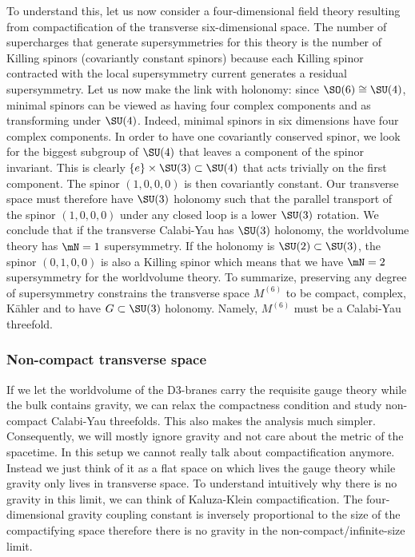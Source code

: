 \documentclass{worksheetclass}
\begin{document}
        To understand this, let us now consider a four-dimensional field theory resulting from compactification of the transverse six-dimensional space. The number of supercharges that generate supersymmetries for this theory is the number of Killing spinors (covariantly constant spinors) because each Killing spinor contracted with the local supersymmetry current generates a residual supersymmetry. Let us now make the link with holonomy: since $\SO(6)\cong\SU(4)$, minimal spinors can be viewed as having four complex components and as transforming under $\SU(4)$. Indeed, minimal spinors in six dimensions have four complex components. In order to have one covariantly conserved spinor, we look for the biggest subgroup of $\SU(4)$ that leaves a component of the spinor invariant. This is clearly $\{e\}\times\SU(3)\subset\SU(4)$ that acts trivially on the first component. The spinor $(1,0,0,0)$ is then covariantly constant. Our transverse space must therefore have $\SU(3)$ holonomy such that the parallel transport of the spinor $(1,0,0,0)$ under any closed loop is a lower $\SU(3)$ rotation. We conclude that if the transverse Calabi-Yau has $\SU(3)$ holonomy, the worldvolume theory has $\mN=1$ supersymmetry. If the holonomy is $\SU(2)\subset\SU(3)$, the spinor $(0,1,0,0)$ is also a Killing spinor which means that we have $\mN=2$ supersymmetry for the worldvolume theory. To summarize, preserving any degree of supersymmetry constrains the transverse space $M^{(6)}$ to be compact, complex, Kähler and to have $G\subset\SU(3)$ holonomy. Namely, $M^{(6)}$ must be a Calabi-Yau threefold.

    \subsubsection*{Non-compact transverse space}
    
        If we let the worldvolume of the D$3$-branes carry the requisite gauge theory while the bulk contains gravity, we can relax the compactness condition and study non-compact Calabi-Yau threefolds. This also makes the analysis much simpler. Consequently, we will mostly ignore gravity and not care about the metric of the spacetime. In this setup we cannot really talk about compactification anymore. Instead we just think of it as a flat space on which lives the gauge theory while gravity only lives in transverse space. To understand intuitively why there is no gravity in this limit, we can think of Kaluza-Klein compactification. The four-dimensional gravity coupling constant is inversely proportional to the size of the compactifying space therefore there is no gravity in the non-compact/infinite-size limit.
\end{document}
